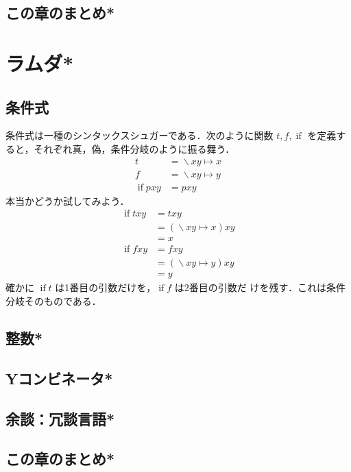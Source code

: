 \documentclass[a5paper,twoside,fleqn,draft]{jsbook}
\newcommand{\mSpecialFunc}[1]{\mathrm{#1}}
\DeclareMathOperator{\mIfFunc}{\mSpecialFunc{if}}
\DeclareMathOperator{\mLambda}{\backslash}
\DeclareMathOperator{\mLambdaArrow}{\mapsto}
\newcommand{\mLambdaEXP}[2]{\mLambda{#1}\mLambdaArrow{#2}} %
\begin{document}
\section{この章のまとめ*}


\chapter{ラムダ*}
\label{ch:lambda}

\section{条件式}

条件式は一種のシンタックスシュガーである．次のように関数
$t,f,\mIfFunc$ を定義すると，それぞれ真，偽，条件分岐のように振る舞う．
\begin{align}
t&=\mLambdaEXP{xy}{x}\\
f&=\mLambdaEXP{xy}{y}\\
\mIfFunc pxy&=pxy
\end{align}
本当かどうか試してみよう．
\begin{align}
\mIfFunc txy&=txy\\
&=(\mLambdaEXP{xy}{x})xy\\
&=x\\
\mIfFunc fxy&=fxy\\
&=(\mLambdaEXP{xy}{y})xy\\
&=y
\end{align}
確かに $\mIfFunc t$ は1番目の引数だけを，$\mIfFunc f$ は2番目の引数だ
けを残す．これは条件分岐そのものである．

\section{整数*}
\section{Yコンビネータ*}


\section{余談：冗談言語*}


\section{この章のまとめ*}
\end{document}
